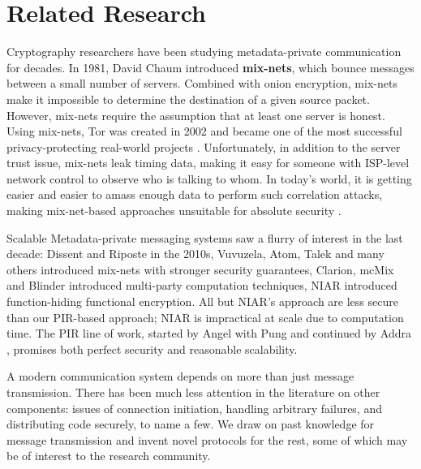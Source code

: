 \section{Related Research}

Cryptography researchers have been studying metadata-private communication for decades. In 1981, David Chaum introduced \textbf{mix-nets}, which bounce messages between a small number of servers. Combined with onion encryption, mix-nets make it impossible to determine the destination of a given source packet. However, mix-nets require the assumption that at least one server is honest. Using mix-nets, Tor was created in 2002 and became one of the most successful privacy-protecting real-world projects \cite{dingledine2004tor}. Unfortunately, in addition to the server trust issue, mix-nets leak timing data, making it easy for someone with ISP-level network control to observe who is talking to whom. In today's world, it is getting easier and easier to amass enough data to perform such correlation attacks, making mix-net-based approaches unsuitable for absolute security \cite{karunanayake2021anonymisation}.

Scalable Metadata-private messaging systems saw a flurry of interest in the last decade: Dissent and Riposte \cite{corrigan2010dissent,corrigan2015riposte} in the 2010s, Vuvuzela, Atom, Talek and many others \cite{van2015vuvuzela,cheng2020talek,kwon2017atom} introduced mix-nets with stronger security guarantees, Clarion, mcMix and Blinder \cite{alexopoulos2017mcmix,eskandarian2021clarion,abraham2020blinder} introduced multi-party computation techniques, NIAR \cite{shi2021non,bunz2021non} introduced function-hiding functional encryption.
All but NIAR's approach are less secure than our PIR-based approach; NIAR is impractical at scale due to computation time.
The PIR line of work, started by Angel with Pung \cite{angel2016unobservable,angel2018pir} and continued by Addra \cite{ahmad2021addra}, promises both perfect security and reasonable scalability.

A modern communication system depends on more than just message transmission. There has been much less attention in the literature on other components: issues of connection initiation, handling arbitrary failures, and distributing code securely, to name a few. We draw on past knowledge for message transmission and invent novel protocols for the rest, some of which may be of interest to the research community.